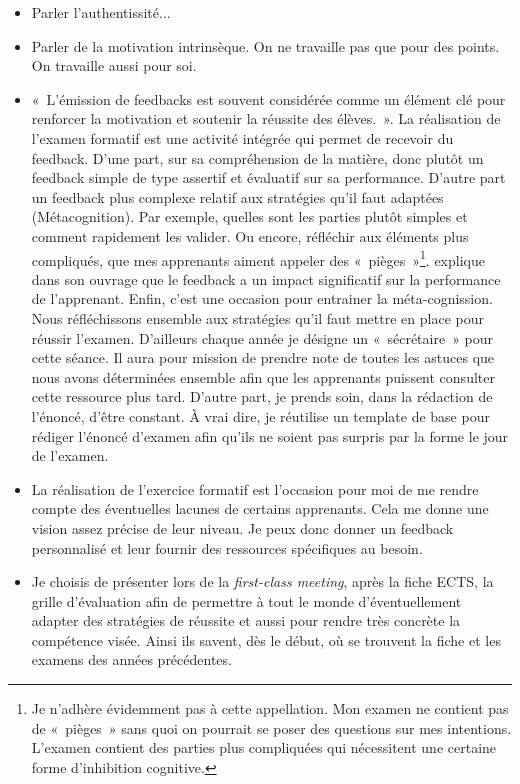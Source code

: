 \begin{itemize}
    \item Parler l'authentissité...
    \item Parler de la motivation intrinsèque. On ne travaille pas que pour des points. On travaille aussi pour soi.
    \item «~L’émission de feedbacks est souvent considérée comme un élément clé pour renforcer la motivation et soutenir la réussite des élèves.~»\cite{georges2011feedbacks}. La réalisation de l'examen formatif est une activité intégrée qui permet de recevoir du feedback. D'une part, sur sa compréhension de la matière, donc plutôt un feedback simple de type assertif et évaluatif\cite{georges2011feedbacks} sur sa performance. D'autre part un feedback plus complexe relatif aux stratégies qu'il faut adaptées (Métacognition). Par exemple, quelles sont les parties plutôt simples et comment rapidement les valider. Ou encore, réfléchir aux éléments plus compliqués, que mes apprenants aiment appeler des «~pièges~»\footnote{Je n'adhère évidemment pas à cette appellation. Mon examen ne contient pas de «~pièges~» sans quoi on pourrait se poser des questions sur mes intentions. L'examen contient des parties plus compliquées qui nécessitent une certaine forme d'inhibition cognitive.}. \citet{hattie2008visible} explique dans son ouvrage que le feedback a un impact significatif sur la performance de l'apprenant. Enfin, c'est une occasion pour entrainer la méta-cognission\cite{leclercq2008modele}. Nous réfléchissons ensemble aux stratégies qu'il faut mettre en place pour réussir l'examen. D'ailleurs chaque année je désigne un «~sécrétaire~» pour cette séance. Il aura pour mission de prendre note de toutes les astuces que nous avons déterminées ensemble afin que les apprenants puissent consulter cette ressource plus tard. D'autre part, je prends soin, dans la rédaction de l'énoncé, d'être constant. À vrai dire, je réutilise un template de base pour rédiger l'énoncé d’examen afin qu’ils ne soient pas surpris par la forme le jour de l'examen.
    \item La réalisation de l'exercice formatif est l'occasion pour moi de me rendre compte des éventuelles lacunes de certains apprenants. Cela me donne une vision assez précise de leur niveau. Je peux donc donner un feedback personnalisé et leur fournir des ressources spécifiques au besoin.
    \item Je choisis de présenter lors de la \textit{first-class meeting}, après la fiche ECTS, la grille d'évaluation afin de permettre à tout le monde d'éventuellement adapter des stratégies de réussite et aussi pour rendre très concrète la compétence visée. Ainsi ils savent, dès le début, où se trouvent la fiche et les examens des années précédentes.
\end{itemize}

